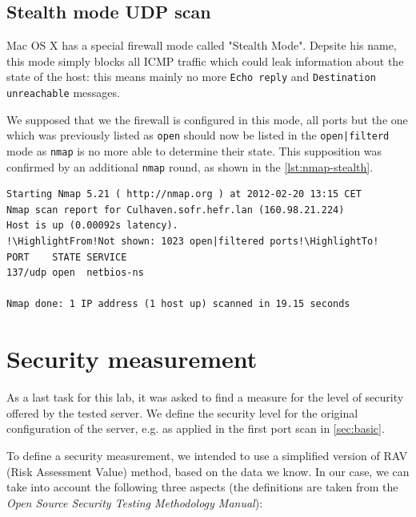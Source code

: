 \documentclass[10pt,a4paper,twoside,onecolumn]{article}
\begin{document}
\subsection{Stealth mode UDP scan}

Mac OS X has a special firewall mode called "Stealth Mode". Depsite his name, this mode simply blocks all ICMP traffic which could leak information about the state of the host: this means mainly no more \texttt{Echo reply} and \texttt{Destination unreachable} messages.

We supposed that we the firewall is configured in this mode, all ports but the one which was previously listed as \texttt{open} should now be listed in the \texttt{open|filterd} mode as \texttt{nmap} is no more able to determine their state. This supposition was confirmed by an additional \texttt{nmap} round, as shown in the \autoref{lst:nmap-stealth}.

\lstset{caption=Output of the custom UDP server during the port scan,label=lst:nmap-stealth}
\begin{lstlisting}
Starting Nmap 5.21 ( http://nmap.org ) at 2012-02-20 13:15 CET
Nmap scan report for Culhaven.sofr.hefr.lan (160.98.21.224)
Host is up (0.00092s latency).
!\HighlightFrom!Not shown: 1023 open|filtered ports!\HighlightTo!
PORT    STATE SERVICE
137/udp open  netbios-ns

Nmap done: 1 IP address (1 host up) scanned in 19.15 seconds
\end{lstlisting}

\section{Security measurement}
\label{sec:measurement}

As a last task for this lab, it was asked to find a measure for the level of security offered by the tested server. We define the security level for the original configuration of the server, e.g. as applied in the first port scan in \autoref{sec:basic}.

To define a security measurement, we intended to use a simplified version of RAV (Risk Assessment Value) method, based on the data we know. In our case, we can take into account the following three aspects (the definitions are taken from the \emph{Open Source Security Testing Methodology Manual}):
\end{document}
